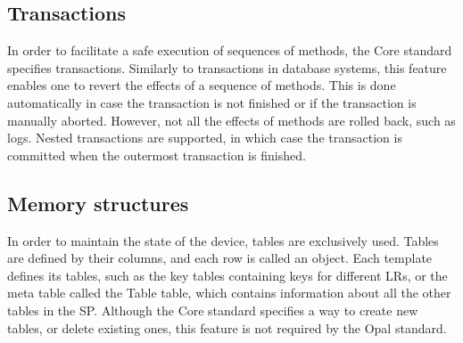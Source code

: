 


\subsection{Transactions}

In order to facilitate a safe execution of sequences of methods, the Core standard specifies transactions. Similarly to transactions in database systems, this feature enables one to revert the effects of a sequence of methods. This is done automatically in case the transaction is not finished or if the transaction is manually aborted. However, not all the effects of methods are rolled back, such as logs. Nested transactions are supported, in which case the transaction is committed when the outermost transaction is finished.




\subsection{Memory structures}

In order to maintain the state of the device, tables are exclusively used. Tables are defined by their columns, and each row is called an object.
Each template defines its tables, such as the key tables containing keys for different LRs, or the meta table called the Table table, which contains information about all the other tables in the SP.
Although the Core standard specifies a way to create new tables, or delete existing ones, this feature is not required by the Opal standard.


